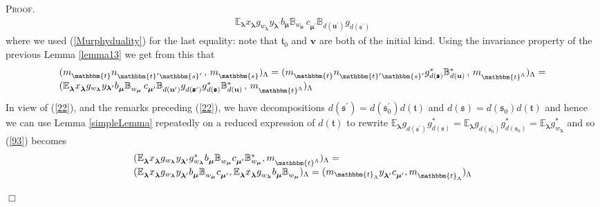 \documentclass[10pt,a4,twoside,hidelinks,rm]{article}
\newcommand{\BB}{\mathbb{B}}
\newcommand\es{\mathbbm{s}}
\newcommand\et{\mathbbm{t}}
\newcommand\bu{\mathbf{u}}
\newcommand\bv{\mathbf{v}}
\newcommand{\bT}{\pmb{\mathfrak{t}}}
\newcommand{\Bs}{\pmb{\mathfrak{s}}}
\newcommand\blambda{{\boldsymbol\lambda}}
\newcommand\be{\mathbb{E}}
\newcommand\bmu{{\boldsymbol\mu}}
\theoremstyle{plain}
\newenvironment{demo}
{\textsc{Proof.}} {\quad \hfill $\Box$}
\begin{document}
\begin{demo}
\begin{equation}
\begin{array}{l}
\be^{}_{\blambda}
 x^{}_{\blambda} g_{w_{\blambda}} y_{ \blambda^{\prime}}
  b^{}_{\bmu}\BB^{}_{ w_{\bmu}}  \,
c^{}_{\bmu^{\prime}}  \BB^{}_{d(\bu^{\prime})} g^{}_{d(\Bs^{\prime})}
\end{array}
\end{equation}
where we used (\ref{Murphyduality}) for the last equality: note that
$ \bT_0 $ and $ \bv $ are both of the initial kind. 
Using the invariance property of the previous Lemma \ref{lemma13} we get from this that
\begin{equation}\label{93}
  \begin{array}{l}
 \setlength\itemsep{0.5em}   
  ( m^{}_{\et } n^{}_{ \et^{\prime} \es^{\prime}} \, , \, m^{}_{\es})_{\Lambda} =
 ( m^{}_{\et } n^{}_{ \et^{\prime} \es^{\prime}}
 g^{\ast}_{d(\Bs)} \BB^{\ast}_{d(\bu)} \, , \,  m^{}_{\et^{\Lambda}})_{\Lambda} = \\
 ( \be^{}_{\blambda}
 x^{}_{\blambda} g_{w_{\blambda}} y_{ \blambda^{\prime}}
  b^{}_{\bmu}\BB^{}_{ w_{\bmu}}  \,
c^{}_{\bmu^{\prime}}  \BB^{}_{d(\bu^{\prime})} g^{}_{d(\Bs^{\prime})}
 g^{\ast}_{d(\Bs)} \BB^{\ast}_{d(\bu)} \, , \, m^{}_{\et^{\Lambda}})_{\Lambda} 
\end{array} 
\end{equation}
In view of (\ref{22}), and the remarks preceding (\ref{22}), 
we have decompositions $ d(\Bs^{\prime}) = d(\Bs^{\prime}_0) d(\bT) $ and
$ d(\Bs) = d(\Bs_0) d(\bT) $ and hence we can use 
Lemma {\ref{simpleLemma}} repeatedly on a reduced expression of $ d(\bT) $ 
to rewrite $  \be^{}_{\blambda} g^{}_{d(\Bs^{\prime})} g^{\ast}_{d(\Bs)}
=  \be^{}_{\blambda} g^{}_{d(\Bs_0^{\prime})} g^{\ast}_{d(\Bs_0)} = 
 \be^{}_{\blambda} g^{\ast}_{w_{\blambda} } $ and so 
 (\ref{93}) becomes
 \begin{equation}\label{94}
 \begin{array}{l}
 \setlength\itemsep{0.5em}   
   ( \be^{}_{\blambda}
 x^{}_{\blambda} g_{w_{\blambda}} y_{ \blambda^{\prime}}^{} g^{\ast}_{w_{\blambda}} 
  b^{}_{\bmu}\BB^{}_{ w_{\bmu}}  
c^{}_{\bmu^{\prime}}  \BB^{\ast}_{w_{\bmu}}     , m^{}_{\et^{\Lambda}})_{\Lambda} =\\
   ( \be^{}_{\blambda}
x^{}_{\blambda} g_{w_{\blambda}} y_{ \blambda^{\prime}}^{}
  b^{}_{\bmu}\BB^{}_{ w_{\bmu}}  
  c^{}_{\bmu^{\prime}} ,  
\be^{}_{\blambda} x^{}_{\blambda}  g^{}_{w_{\blambda}}  b^{}_{\bmu}      \BB^{}_{w_{\bmu}}     )_{\Lambda}
=
( m_{\et_{\Lambda}} y^{}_{ \blambda^{\prime}} c^{}_{\bmu^{\prime}} 
      , m^{}_{\et_{\Lambda}})_{\Lambda} 
\end{array}
 \end{equation}

\end{demo}
\end{document}
